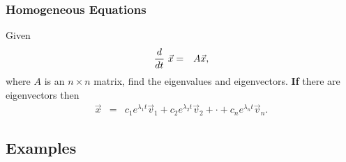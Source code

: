 \begin{frame}
  \frametitle{Homogeneous Equations}

  Given
  \begin{eqnarray*}
    \deriv{~}{t} \vec{x} & = & A \vec{x},
  \end{eqnarray*}
  where $A$ is an $n\times n$ matrix, find the eigenvalues and
  eigenvectors. \textbf{If} there are 
  eigenvectors then
  \begin{eqnarray*}
    \vec{x} & = & c_1 e^{\lambda_1 t} \vec{v}_1 + c_2 e^{\lambda_2 t} \vec{v}_2 +
    \cdot + c_n e^{\lambda_n t} \vec{v}_n.
  \end{eqnarray*}

\end{frame}

\subsection{Examples}

